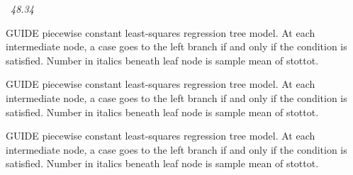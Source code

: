 \documentclass[12pt]{article}
\begin{document}
 \begin{center}
    ~{\textit{48.34}}
 \end{center}
GUIDE piecewise constant least-squares regression tree model.
At each intermediate node, a case goes to the left branch 
  if and only if the condition is satisfied.
Number in italics beneath leaf node is sample mean of stottot.
 \begin{center}
 \end{center}
GUIDE piecewise constant least-squares regression tree model.
At each intermediate node, a case goes to the left branch 
  if and only if the condition is satisfied.
Number in italics beneath leaf node is sample mean of stottot.
 \begin{center}
 \end{center}
GUIDE piecewise constant least-squares regression tree model.
At each intermediate node, a case goes to the left branch 
  if and only if the condition is satisfied.
Number in italics beneath leaf node is sample mean of stottot.


\end{document}
